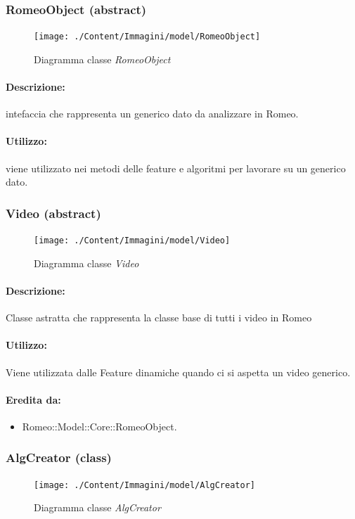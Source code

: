	\subsubsection{RomeoObject (abstract)}
	\begin{figure}[!h]
		\centering
		\texttt{[image: ./Content/Immagini/model/RomeoObject]}
		\caption{Diagramma classe \textsl{RomeoObject}}
	\end{figure}
	\paragraph{Descrizione:} intefaccia che rappresenta un generico dato da analizzare in Romeo\g{}.
	\paragraph{Utilizzo:} viene utilizzato nei metodi delle feature e algoritmi per lavorare su un generico dato.
	\subsubsection{Video (abstract)}
	\begin{figure}[!h]
		\centering
		\texttt{[image: ./Content/Immagini/model/Video]}
		\caption{Diagramma classe \textsl{Video}}
	\end{figure}
	\paragraph{Descrizione:} Classe astratta che rappresenta la classe base di tutti i video in Romeo\g{}
	\paragraph{Utilizzo:} Viene utilizzata dalle Feature\g{} dinamiche quando ci si aspetta un video generico.
	\paragraph{Eredita da:}
		\begin{itemize}
			\item Romeo::Model::Core::RomeoObject.
		\end{itemize}
	\subsubsection{AlgCreator (class)}
	\begin{figure}[!h]
		\centering
		\texttt{[image: ./Content/Immagini/model/AlgCreator]}
		\caption{Diagramma classe \textsl{AlgCreator}}
	\end{figure}
